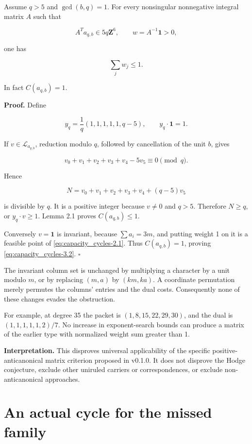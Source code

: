 Assume \(q>5\) and \(\gcd(b,q)=1\). For every nonsingular nonnegative
integral matrix \(A\) such that

\[
A^Ta_{q,b}\in5q\mathbf Z^6,
\qquad w=A^{-1}\mathbf1>0,
\]

one has

\begin{equation}\label{eq:capacity_cycles-3.2}
\boxed{\sum_j w_j\le1.}\end{equation}

In fact \(C(a_{q,b})=1\).

\textbf{Proof.} Define

\[
y_q=\frac1q(1,1,1,1,1,q-5),\qquad y_q\cdot\mathbf1=1.
\]

If \(v\in\mathcal L_{a_{q,b}}\), reduction modulo \(q\), followed by
cancellation of the unit \(b\), gives

\[
v_0+v_1+v_2+v_3+v_4-5v_5\equiv0\pmod q.
\]

Hence

\[
N=v_0+v_1+v_2+v_3+v_4+(q-5)v_5
\]

is divisible by \(q\). It is a positive integer because \(v\ne0\) and
\(q>5\). Therefore \(N\ge q\), or \(y_q\cdot v\ge1\). Lemma 2.1 proves
\(C(a_{q,b})\le1\).

Conversely \(v=\mathbf1\) is invariant, because \(\sum a_i=3m\), and
putting weight 1 on it is a feasible point of \eqref{eq:capacity_cycles-2.1}. Thus
\(C(a_{q,b})=1\), proving \eqref{eq:capacity_cycles-3.2}. \(\square\)

The invariant column set is unchanged by multiplying a character by a
unit modulo \(m\), or by replacing \((m,a)\) by \((km,ka)\). A
coordinate permutation merely permutes the columns' entries and the dual
costs. Consequently none of these changes evades the obstruction.

For example, at degree 35 the packet is \((1,8,15,22,29,30)\), and the
dual is \((1,1,1,1,1,2)/7\). No increase in exponent-search bounds can
produce a matrix of the earlier type with normalized weight sum greater
than 1.

\textbf{Interpretation.} This disproves universal applicability of the
specific positive-anticanonical matrix criterion proposed in v0.1.0. It
does not disprove the Hodge conjecture, exclude other uniruled carriers
or correspondences, or exclude non-anticanonical approaches.

\hypertarget{capacity_cycles-an-actual-cycle-for-the-missed-family}{%
\section{An actual cycle for the missed
family}\label{capacity_cycles-an-actual-cycle-for-the-missed-family}}

